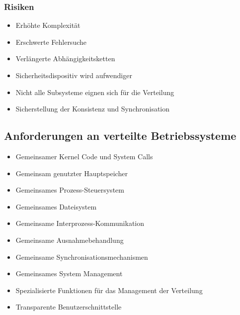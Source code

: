 \documentclass[a4paper, 10pt]{article}
\begin{document}
\subsubsection{Risiken}
\begin{itemize}
	\item Erhöhte Komplexität
	\item Erschwerte Fehlersuche	
	\item Verlängerte Abhängigkeitsketten
	\item Sicherheitsdispositiv wird aufwendiger
	\item Nicht alle Subsysteme eignen sich für die Verteilung
	\item Sicherstellung der Konsistenz und Synchronisation
\end{itemize}

\subsection{Anforderungen an verteilte Betriebssysteme}
\begin{itemize}
	\item Gemeinsamer Kernel Code und System Calls
	\item Gemeinsam genutzter Hauptspeicher
	\item Gemeinsames Prozess-Steuersystem
	\item Gemeinsames Dateisystem
	\item Gemeinsame Interprozess-Kommunikation
	\item Gemeinsame Ausnahmebehandlung
	\item Gemeinsame Synchronisationsmechanismen
	\item Gemeinsames System Management
	\item Spezialisierte Funktionen für das Management der Verteilung
	\item Transparente Benutzerschnittstelle
\end{itemize}
\end{document}
